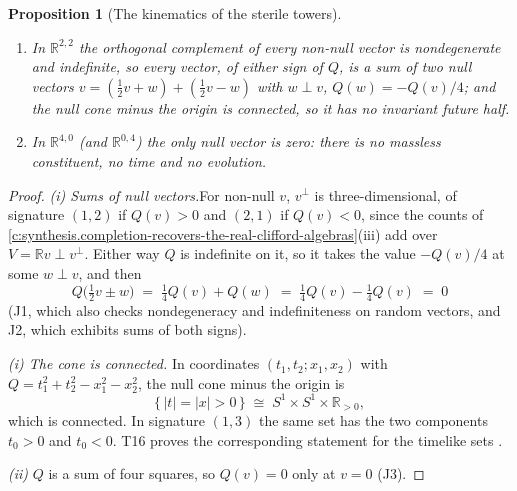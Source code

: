 \documentclass[11pt]{article}
\newtheorem{proposition}[theorem]{Proposition}
\theoremstyle{definition}
\theoremstyle{plain}
\newcommand{\changedmark}[2]{\marginpar{\raggedright\scriptsize\color{#1}#2}}
\providecommand{\R}{}\renewcommand{\R}{\mathbb{R}}
\begin{document}
\begin{proposition}[The kinematics of the sterile towers]\label{c:dark-tower-matter.sterile-kinematics}
\changedmark{BurntOrange}{changed since the deposit}
\begin{enumerate}
\item[(i)] In $\R^{2,2}$ the orthogonal complement of every non-null vector is nondegenerate and indefinite, so every vector, of either sign of $Q$, is a sum of two null vectors $v = (\tfrac{1}{2}v + w) + (\tfrac{1}{2}v - w)$ with $w \perp v$, $Q(w) = -Q(v)/4$; and the null cone minus the origin is connected, so it has no invariant future half.
\item[(ii)] In $\R^{4,0}$ (and $\R^{0,4}$) the only null vector is zero: there is no massless constituent, no time and no evolution.
\end{enumerate}
\end{proposition}
\begin{proof}
\textit{(i) Sums of null vectors.}\enspace For non-null $v$, $v^{\perp}$ is three-dimensional, of signature $(1,2)$ if $Q(v) > 0$ and $(2,1)$ if $Q(v) < 0$, since the counts of \ref{c:synthesis.completion-recovers-the-real-clifford-algebras}(iii) add over $V = \R v \perp v^{\perp}$. Either way $Q$ is indefinite on it, so it takes the value $-Q(v)/4$ at some $w \perp v$, and then
\[
Q\bigl(\tfrac{1}{2}v \pm w\bigr) \;=\; \tfrac{1}{4}Q(v) + Q(w) \;=\; \tfrac{1}{4}Q(v) - \tfrac{1}{4}Q(v) \;=\; 0
\]
(J1, which also checks nondegeneracy and indefiniteness on random vectors, and J2, which exhibits sums of both signs).



\emph{(i) The cone is connected.}  In coordinates $(t_{1}, t_{2}; x_{1}, x_{2})$ with $Q = t_{1}^{2} + t_{2}^{2} - x_{1}^{2} - x_{2}^{2}$, the null cone minus the origin is
\[
\bigl\{\, |t| = |x| > 0 \,\bigr\} \;\cong\; S^{1} \times S^{1} \times \R_{>0},
\]
which is connected. In signature $(1,3)$ the same set has the two components $t_{0} > 0$ and $t_{0} < 0$. T16 proves the corresponding statement for the timelike sets \cite[Lem.~4.4]{ButlerT16}.



\emph{(ii)}  $Q$ is a sum of four squares, so $Q(v) = 0$ only at $v = 0$ (J3).

\end{proof}
\end{document}
